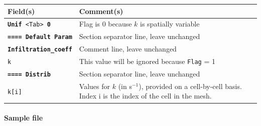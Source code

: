     \begin{tabular}{p{6cm} | p{9cm}}
    \hline
    Field(s) & Comment(s) \\
    \hline  \hline
    \texttt{\textbf{Unif} <Tab> \textbf{0}} & Flag is 0 because $k$ is spatially variable \\ 
    \hline
    \texttt{\textbf{==== Default Param}} & Section separator line, leave unchanged \\ 
    \hline
    \texttt{\textbf{Infiltration\_coeff}} & Comment line, leave unchanged \\ 
    \hline
    \texttt{k}     & This value will be ignored because \texttt{Flag} = 1 \\ 
    \hline
    \texttt{\textbf{==== Distrib}} & Section separator line, leave unchanged \\  
    \hline
    \texttt{k[i]}      & Values for $k$ (in s$^{-1}$), provided on a cell-by-cell basis. Index i is the index of the cell in the mesh.  \\ 
    \hline
    \end{tabular}

\paragraph*{Sample file}
\begin{verbatim}
\end{verbatim}